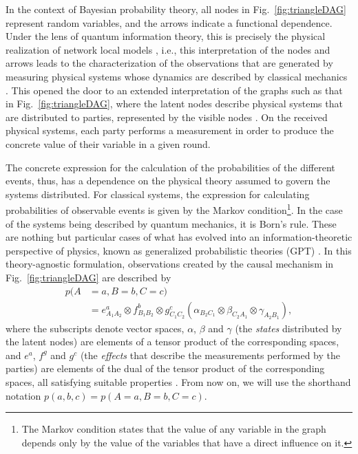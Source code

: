 \documentclass[aps,physrev,reprint,superscriptaddress,nofootinbib,twocolumn]{revtex4-2}
\begin{document}
In the context of Bayesian probability theory, all nodes in Fig.~\ref{fig:triangleDAG} represent random variables, and the arrows indicate a functional dependence.
Under the lens of quantum information theory, this is precisely the physical realization of network local models \cite{fritz2012,TavakoliPozas2022}, i.e., this interpretation of the nodes and arrows leads to the characterization of the observations that are generated by measuring physical systems whose dynamics are described by classical mechanics \cite{wood2015}.
This opened the door to an extended interpretation of the graphs such as that in Fig.~\ref{fig:triangleDAG}, where the latent nodes describe physical systems that are distributed to parties, represented by the visible nodes \cite{Henson2014,Weilenmann2020}.
On the received physical systems, each party performs a measurement in order to produce the concrete value of their variable in a given round.

The concrete expression for the calculation of the probabilities of the different events, thus, has a dependence on the physical theory assumed to govern the systems distributed.
For classical systems, the expression for calculating probabilities of observable events is given by the Markov condition\footnote{The Markov condition states that the value of any variable in the graph depends only by the value of the variables that have a direct influence on it.}.
In the case of the systems being described by quantum mechanics, it is Born's rule.
These are nothing but particular cases of what has evolved into an information-theoretic perspective of physics, known as generalized probabilistic theories (GPT) \cite{janotta2014,plavala2023,Weilenmann2020}.
In this theory-agnostic formulation, observations created by the causal mechanism in Fig.~\ref{fig:triangleDAG} are described by
\begin{equation}
    \begin{aligned}
        p(A&=a,B=b,C=c) \\
        &= e^a_{A_1A_2}\otimes f^b_{B_1B_2}\otimes g^c_{C_1C_2}\left(\alpha_{B_2C_1}\otimes\beta_{C_2A_1}\otimes\gamma_{A_2B_1}\right),
    \end{aligned}
    \label{eq:GPT}
\end{equation}
where the subscripts denote vector spaces, $\alpha$, $\beta$ and $\gamma$ (the \textit{states} distributed by the latent nodes) are elements of a tensor product of the corresponding spaces, and $e^a$, $f^g$ and $g^c$ (the \textit{effects} that describe the measurements performed by the parties) are elements of the dual of the tensor product of the corresponding spaces, all satisfying suitable properties \cite{ludwigbook,krausbook}.
From now on, we will use the shorthand notation $p(a,b,c)=p(A=a,B=b,C=c)$.
\end{document}
